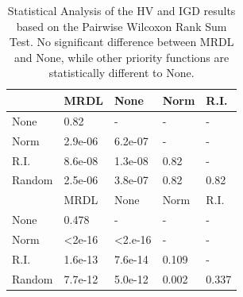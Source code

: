 \begin{table}[!t]
	\begin{tabular}{lllll}
		\hline
		\rowcolor[gray]{.7} \multicolumn{1}{|l|}{HV}  & \multicolumn{1}{|l|}{MRDL} & \multicolumn{1}{l|}{None} & \multicolumn{1}{l|}{Norm} & \multicolumn{1}{l|}{R.I.} \\ \hline \hline \hline
		None                      & 0.82                      & -                         & -                         & -                         \\
		\rowcolor[gray]{.95}Norm                      & 2.9e-06                   & 6.2e-07                   & -                         & -                         \\
		R.I.                      & 8.6e-08                   & 1.3e-08                   & 0.82                      & -                         \\
		\rowcolor[gray]{.95}Random                    & 2.5e-06                   & 3.8e-07                   & 0.82                      & 0.82                      \\ \hline \hline \hline
		\rowcolor[gray]{.7} \multicolumn{1}{|l|}{IGD} & \multicolumn{1}{|l|}{MRDL} & \multicolumn{1}{l|}{None} & \multicolumn{1}{l|}{Norm} & \multicolumn{1}{l|}{R.I.} \\ \hline \hline \hline
		None                      & 0.478                     & -                         & -                         & -                         \\
		\rowcolor[gray]{.95}Norm                      & \textless 2e-16           & \textless 2.e-16          & -                         & -                         \\
		R.I.                      & 1.6e-13                   & 7.6e-14                   & 0.109                     & -                         \\
		\rowcolor[gray]{.95}Random                    & 7.7e-12                   & 5.0e-12                   & 0.002                     & 0.337
	\end{tabular}
	\caption{Statistical Analysis of the HV and IGD results based on the Pairwise Wilcoxon Rank Sum Test. No significant difference between MRDL and None, while other priority functions are statistically different to None.}
	\label{statistics}
\end{table}



